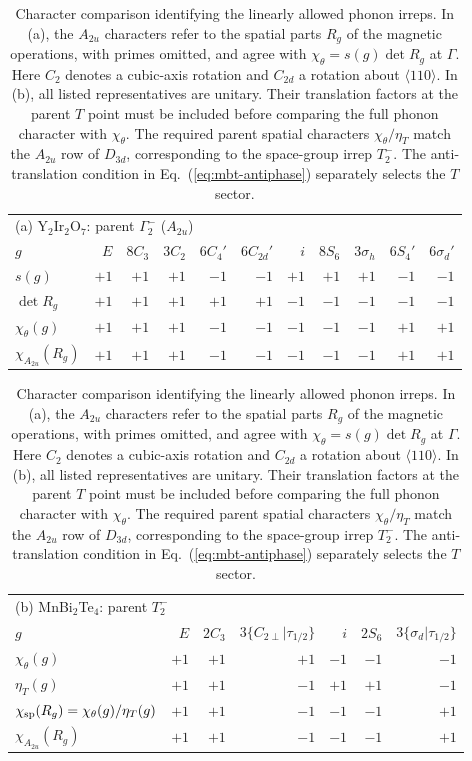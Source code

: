 \documentclass[galley,aps,pra,10pt,amsmath,amssymb,
    superscriptaddress,nofootinbib,longbibliography]{revtex4-2}
\newcounter{comm}
\newcommand{\eq}[1]{Eq.~(\ref{eq:#1})}
\newcommand{\MBT}{MnBi$_2$Te$_4$}
\newcommand{\YIO}{Y$_2$Ir$_2$O$_7$}
\begin{document}
\begin{table}[t]
\caption{Character comparison identifying the linearly allowed phonon irreps. In (a), the $A_{2u}$ characters refer to the spatial parts $R_g$ of the magnetic operations, with primes omitted, and agree with $\chi_\theta=s(g)\det R_g$ at $\Gamma$. Here $C_2$ denotes a cubic-axis rotation and $C_{2d}$ a rotation about $\langle110\rangle$. In (b), all listed representatives are unitary. Their translation factors at the parent $T$ point must be included before comparing the full phonon character with $\chi_\theta$. The required parent spatial characters $\chi_\theta/\eta_T$ match the $A_{2u}$ row of $D_{3d}$, corresponding to the space-group irrep $T_2^-$. The anti-translation condition in \eq{mbt-antiphase} separately selects the $T$ sector.}
\label{tab:characters}
\begingroup
\setlength{\tabcolsep}{3pt}
\begin{ruledtabular}
\begin{tabular}{@{}lrrrrrrrrrr@{}}
\multicolumn{11}{l}{(a) \YIO{}: parent $\Gamma_2^-$ ($A_{2u}$)} \\
$g$ & $E$ & $8C_3$ & $3C_2$ & $6C_4'$ & $6C_{2d}'$
& $i$ & $8S_6$ & $3\sigma_h$ & $6S_4'$ & $6\sigma_d'$ \\
\hline
$s(g)$ & $+1$ & $+1$ & $+1$ & $-1$ & $-1$
& $+1$ & $+1$ & $+1$ & $-1$ & $-1$ \\
$\det R_g$ & $+1$ & $+1$ & $+1$ & $+1$ & $+1$
& $-1$ & $-1$ & $-1$ & $-1$ & $-1$ \\
$\chi_\theta(g)$ & $+1$ & $+1$ & $+1$ & $-1$ & $-1$
& $-1$ & $-1$ & $-1$ & $+1$ & $+1$ \\
$\chi_{A_{2u}}(R_g)$ & $+1$ & $+1$ & $+1$ & $-1$ & $-1$
& $-1$ & $-1$ & $-1$ & $+1$ & $+1$ \\
\end{tabular}
\end{ruledtabular}
\vspace{6pt}
\begin{ruledtabular}
\begin{tabular}{@{}lrrrrrr@{}}
\multicolumn{7}{l}{(b) \MBT{}: parent $T_2^-$} \\
$g$ & $E$ & $2C_3$ & $3\{C_{2\perp}|\tau_{1/2}\}$
& $i$ & $2S_6$ & $3\{\sigma_d|\tau_{1/2}\}$ \\
\hline
$\chi_\theta(g)$ & $+1$ & $+1$ & $+1$ & $-1$ & $-1$ & $-1$ \\
$\eta_T(g)$ & $+1$ & $+1$ & $-1$ & $+1$ & $+1$ & $-1$ \\
$\chi_{\rm sp}(R_g)=\chi_\theta(g)/\eta_T(g)$
& $+1$ & $+1$ & $-1$ & $-1$ & $-1$ & $+1$ \\
$\chi_{A_{2u}}(R_g)$ & $+1$ & $+1$ & $-1$ & $-1$ & $-1$ & $+1$ \\
\end{tabular}
\end{ruledtabular}
\endgroup
\end{table}
\end{document}
